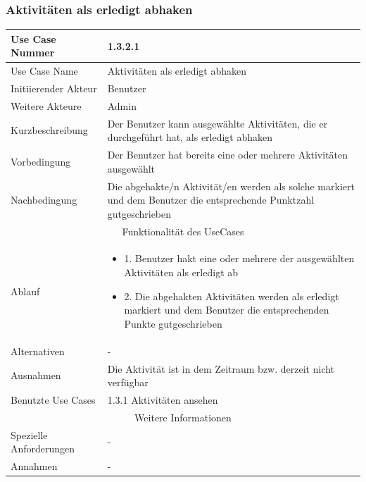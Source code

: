 \documentclass[10pt,a4paper]{article}
\begin{document}
	\subsubsection{Aktivit\"aten als erledigt abhaken}
	\begin{tabular}{|l|p{.5\linewidth}|}
	\hline Use Case Nummer & 1.3.2.1 \\ 
	\hline Use Case Name & Aktivit\"aten als erledigt abhaken \\ 
	\hline Initiierender Akteur & Benutzer \\
	\hline Weitere Akteure & Admin \\
	\hline Kurzbeschreibung & Der Benutzer kann ausgew\"ahlte Aktivit\"aten, die er durchgef\"uhrt hat, als erledigt abhaken \\
	\hline Vorbedingung & Der Benutzer hat bereits eine oder mehrere Aktivit\"aten ausgew\"ahlt \\
	\hline Nachbedingung & Die abgehakte/n Aktivit\"at/en werden als solche markiert und dem Benutzer die entsprechende Punktzahl gutgeschrieben \\
	\hline \multicolumn{2}{|c|}{Funktionalität des UseCases}\\
	\hline Ablauf & \begin{itemize}
			\item 1. Benutzer hakt eine oder mehrere der ausgew\"ahlten Aktivit\"aten als erledigt ab
			\item 2. Die abgehakten Aktivit\"aten werden als erledigt markiert und dem Benutzer die entsprechenden Punkte gutgeschrieben
		\end{itemize} \\
	\hline Alternativen & - \\
	\hline Ausnahmen & Die Aktivit\"at ist in dem Zeitraum bzw. derzeit nicht verf\"ugbar \\
	\hline Benutzte Use Cases & 1.3.1 Aktivit\"aten ansehen \\
	\hline \multicolumn{2}{|c|}{Weitere Informationen} \\
	\hline Spezielle Anforderungen & - \\
	\hline Annahmen & - \\
	\hline
	\end{tabular} 
\end{document}
